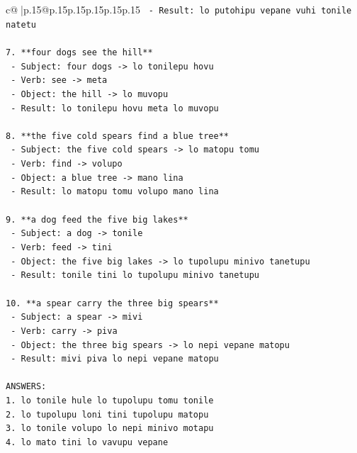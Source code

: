 \documentclass{article}
\begin{document}
{\begin{supertabular}{c@{$\;$}|p{.15\linewidth}@{}p{.15\linewidth}p{.15\linewidth}p{.15\linewidth}p{.15\linewidth}p{.15\linewidth}}
{{{\texttt{   {-} Result: lo putohipu vepane vuhi tonile natetu} \\
\\ 
\texttt{7. **four dogs see the hill**} \\
\texttt{   {-} Subject: four dogs {-}> lo tonilepu hovu} \\
\texttt{   {-} Verb: see {-}> meta} \\
\texttt{   {-} Object: the hill {-}> lo muvopu} \\
\texttt{   {-} Result: lo tonilepu hovu meta lo muvopu} \\
\\ 
\texttt{8. **the five cold spears find a blue tree**} \\
\texttt{   {-} Subject: the five cold spears {-}> lo matopu tomu} \\
\texttt{   {-} Verb: find {-}> volupo} \\
\texttt{   {-} Object: a blue tree {-}> mano lina} \\
\texttt{   {-} Result: lo matopu tomu volupo mano lina} \\
\\ 
\texttt{9. **a dog feed the five big lakes**} \\
\texttt{   {-} Subject: a dog {-}> tonile} \\
\texttt{   {-} Verb: feed {-}> tini} \\
\texttt{   {-} Object: the five big lakes {-}> lo tupolupu minivo tanetupu} \\
\texttt{   {-} Result: tonile tini lo tupolupu minivo tanetupu} \\
\\ 
\texttt{10. **a spear carry the three big spears**} \\
\texttt{    {-} Subject: a spear {-}> mivi} \\
\texttt{    {-} Verb: carry {-}> piva} \\
\texttt{    {-} Object: the three big spears {-}> lo nepi vepane matopu} \\
\texttt{    {-} Result: mivi piva lo nepi vepane matopu} \\
\\ 
\texttt{ANSWERS:} \\
\texttt{1. lo tonile hule lo tupolupu tomu tonile} \\
\texttt{2. lo tupolupu loni tini tupolupu matopu} \\
\texttt{3. lo tonile volupo lo nepi minivo motapu} \\
\texttt{4. lo mato tini lo vavupu vepane} \\
}}}
\end{supertabular}}
\end{document}
